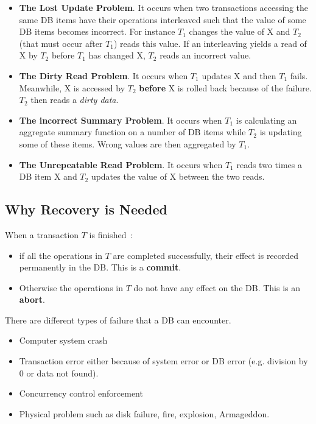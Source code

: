 \begin{itemize}
    \item \textbf{The Lost Update Problem}. It occurs when two transactions accessing the same DB items have their operations interleaved such that the value of some DB items becomes incorrect. For instance $T_1$ changes the value of X and $T_2$ (that must occur after $T_1$) reads this value. If an interleaving yields a read of X by $T_2$ before $T_1$ has changed X, $T_2$ reads an incorrect value.

    \item \textbf{The Dirty Read Problem}. It occurs when $T_1$ updates X and then $T_1$ fails. Meanwhile, X is accessed by $T_2$ \textbf{before} X is rolled back because of the failure. $T_2$ then reads a \textit{dirty data}.

    \item \textbf{The incorrect Summary Problem}. It occurs when $T_1$ is calculating an aggregate summary function on a number of DB items while $T_2$ is updating some of these items. Wrong values are then aggregated by $T_1$.

    \item \textbf{The Unrepeatable Read Problem}. It occurs when $T_1$ reads two times a DB item X and $T_2$ updates the value of X between the two reads.
\end{itemize}

\subsection{Why Recovery is Needed}
When a transaction $T$ is finished~:
\begin{itemize}
    \item if all the operations in $T$ are completed successfully, their effect is recorded permanently in the DB. This is a \textbf{commit}.
    \item Otherwise the operations in $T$ do not have any effect on the DB. This is an \textbf{abort}.
\end{itemize}

There are different types of failure that a DB can encounter.

\begin{itemize}
    \item Computer system crash
    \item Transaction error either because of system error or DB error (e.g. division by 0 or data not found).
    \item Concurrency control enforcement
    \item Physical problem such as disk failure, fire, explosion, Armageddon.
\end{itemize}

